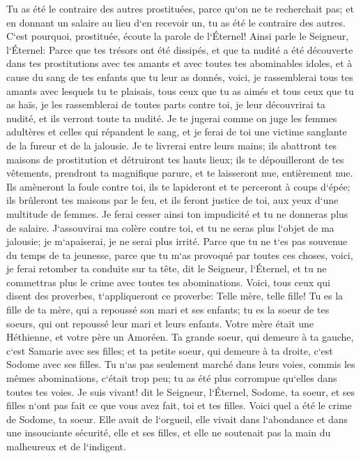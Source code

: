 \verse Tu as été le contraire des autres prostituées, parce qu`on ne te recherchait pas; et en donnant un salaire au lieu d`en recevoir un, tu as été le contraire des autres. 
\verse C`est pourquoi, prostituée, écoute la parole de l`Éternel! 
\verse Ainsi parle le Seigneur, l`Éternel: Parce que tes trésors ont été dissipés, et que ta nudité a été découverte dans tes prostitutions avec tes amants et avec toutes tes abominables idoles, et à cause du sang de tes enfants que tu leur as donnés, 
\verse voici, je rassemblerai tous tes amants avec lesquels tu te plaisais, tous ceux que tu as aimés et tous ceux que tu as haïs, je les rassemblerai de toutes parts contre toi, je leur découvrirai ta nudité, et ils verront toute ta nudité. 
\verse Je te jugerai comme on juge les femmes adultères et celles qui répandent le sang, et je ferai de toi une victime sanglante de la fureur et de la jalousie. 
\verse Je te livrerai entre leurs mains; ils abattront tes maisons de prostitution et détruiront tes hauts lieux; ils te dépouilleront de tes vêtements, prendront ta magnifique parure, et te laisseront nue, entièrement nue. 
\verse Ils amèneront la foule contre toi, ils te lapideront et te perceront à coups d`épée; 
\verse ils brûleront tes maisons par le feu, et ils feront justice de toi, aux yeux d`une multitude de femmes. Je ferai cesser ainsi ton impudicité et tu ne donneras plus de salaire. 
\verse J`assouvirai ma colère contre toi, et tu ne seras plus l`objet de ma jalousie; je m`apaiserai, je ne serai plus irrité. 
\verse Parce que tu ne t`es pas souvenue du temps de ta jeunesse, parce que tu m`as provoqué par toutes ces choses, voici, je ferai retomber ta conduite sur ta tête, dit le Seigneur, l`Éternel, et tu ne commettras plus le crime avec toutes tes abominations. 
\verse Voici, tous ceux qui disent des proverbes, t`appliqueront ce proverbe: Telle mère, telle fille! 
\verse Tu es la fille de ta mère, qui a repoussé son mari et ses enfants; tu es la soeur de tes soeurs, qui ont repoussé leur mari et leurs enfants. Votre mère était une Héthienne, et votre père un Amoréen. 
\verse Ta grande soeur, qui demeure à ta gauche, c`est Samarie avec ses filles; et ta petite soeur, qui demeure à ta droite, c`est Sodome avec ses filles. 
\verse Tu n`as pas seulement marché dans leurs voies, commis les mêmes abominations, c`était trop peu; tu as été plus corrompue qu`elles dans toutes tes voies. 
\verse Je suis vivant! dit le Seigneur, l`Éternel, Sodome, ta soeur, et ses filles n`ont pas fait ce que vous avez fait, toi et tes filles. 
\verse Voici quel a été le crime de Sodome, ta soeur. Elle avait de l`orgueil, elle vivait dans l`abondance et dans une insouciante sécurité, elle et ses filles, et elle ne soutenait pas la main du malheureux et de l`indigent. 
